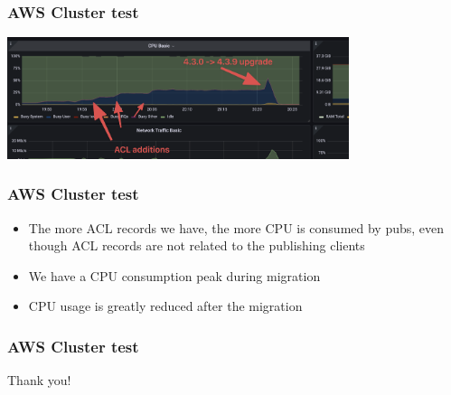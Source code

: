 \documentclass{beamer}
\begin{document}
\begin{frame}
    \frametitle{AWS Cluster test}

    \begin{center}
        \includegraphics[width=10cm, keepaspectratio]{images/optimized-cluster.png}
    \end{center}
\end{frame}

\begin{frame}
    \frametitle{AWS Cluster test}

    \begin{itemize}
        \item The more ACL records we have, the more CPU is consumed by pubs,
            even though ACL records are not related to the publishing clients
        \item We have a CPU consumption peak during migration
        \item CPU usage is greatly reduced after the migration
    \end{itemize}
\end{frame}

\begin{frame}
    \frametitle{AWS Cluster test}

    \begin{center}
        Thank you!
    \end{center}
\end{frame}
\end{document}
